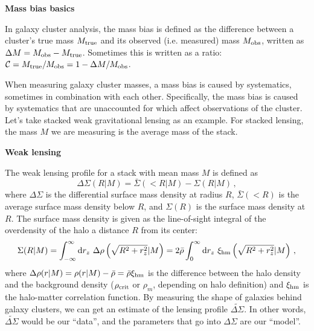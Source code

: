 \documentclass[12pt]{article}
\newcommand{\wds}{\widetilde{\Delta\Sigma}}
\newcommand{\ds}{\Delta\Sigma}
\begin{document}
\noindent
{\bf Mass bias basics}

In galaxy cluster analysis, the mass bias is defined as the difference between a cluster's true mass $M_{\rm true}$ and its observed (i.e. measured) mass $M_{\rm obs}$, written as $\Delta M = M_{\rm obs}-M_{\rm true}$. Sometimes this is written as a ratio: $\mathcal{C} = M_{\rm true}/M_{\rm obs} = 1-\Delta M/M_{\rm obs}$.

When measuring galaxy cluster masses, a mass bias is caused by systematics, sometimes in combination with each other. Specifically, the mass bias is caused by systematics that are unaccounted for which affect observations of the cluster. Let's take stacked weak gravitational lensing as an example. For stacked lensing, the mass $M$ we are measuring is the average mass of the stack.

\vspace{12pt}
\noindent
{\bf Weak lensing}

The weak lensing profile for a stack with mean mass $M$ is defined as 
%
\begin{equation}
	\label{eq:deltasigma_def}
	\Delta\Sigma(R|M) = \bar{\Sigma}(<R|M) - \Sigma(R|M)\,,
\end{equation}
%
where $\Delta\Sigma$ is the differential surface mass density at radius $R$, $\bar{\Sigma}(<R)$ is the average surface mass density below $R$, and $\Sigma(R)$ is the surface mass density at $R$. The surface mass density is given as the line-of-sight integral of the overdensity of the halo a distance $R$ from its center:
%
\begin{equation}
	\label{eq:sigma_def}
	\Sigma(R|M) = \int_{-\infty}^{\infty} {\rm d}r_z\ \Delta\rho\left(\sqrt{R^2+r_z^2}|M\right) = 2\bar{\rho}\int_0^\infty {\rm d}r_z\ \xi_{\rm hm}\left(\sqrt{R^2+r_z^2}|M\right)\,,
\end{equation}
%
where $\Delta\rho(r|M) = \rho(r|M) - \bar{\rho} = \bar{\rho}\xi_{\rm hm}$ is the difference between the halo density and the background density ($\rho_{\rm crit}$ or $\rho_{m}$, depending on halo definition) and $\xi_{\rm hm}$ is the halo-matter correlation function. By measuring the shape of galaxies behind galaxy clusters, we can get an estimate of the lensing profile $\wds$. In other words, $\wds$ would be our ``data'', and the parameters that go into $\ds$ are our ``model''.
\end{document}

